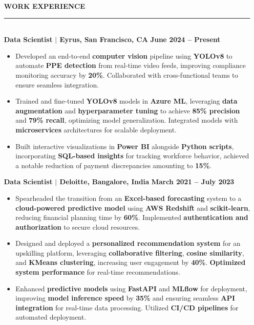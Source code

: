 \documentclass{article}
\begin{document}
\noindent \textbf{{WORK EXPERIENCE}} \vspace{-8pt} \\
\rule{\linewidth}{0.5pt} \\
\noindent \textbf{Data Scientist $\mid$ Eyrus, San Francisco, CA} \hfill \textbf{June 2024 -- Present}
\begin{itemize}[noitemsep, nolistsep, leftmargin=*]
    \item Developed an end-to-end \textbf{computer vision} pipeline using \textbf{YOLOv8} to automate \textbf{PPE detection} from real-time video feeds, improving compliance monitoring accuracy by \textbf{20\%}. Collaborated with cross-functional teams to ensure seamless integration.
    \item Trained and fine-tuned \textbf{YOLOv8} models in \textbf{Azure ML}, leveraging \textbf{data augmentation} and \textbf{hyperparameter tuning} to achieve \textbf{85\% precision} and \textbf{79\% recall}, optimizing model generalization. Integrated models with \textbf{microservices} architectures for scalable deployment.
    \item Built interactive visualizations in \textbf{Power BI} alongside \textbf{Python scripts}, incorporating \textbf{SQL-based insights} for tracking workforce behavior, achieved a notable reduction of payment discrepancies amounting to \textbf{15\%}.
\end{itemize}

\vspace{1mm}
\noindent \textbf{Data Scientist $\mid$ Deloitte, Bangalore, India} \hfill \textbf{March 2021 -- July 2023}
\begin{itemize}[noitemsep, nolistsep, leftmargin=*]
    \item Spearheaded the transition from an \textbf{Excel-based forecasting} system to a \textbf{cloud-powered predictive model} using \textbf{AWS Redshift} and \textbf{scikit-learn}, reducing financial planning time by \textbf{60\%}. Implemented \textbf{authentication and authorization} to secure cloud resources.
    \item Designed and deployed a \textbf{personalized recommendation system} for an upskilling platform, leveraging \textbf{collaborative filtering}, \textbf{cosine similarity}, and \textbf{KMeans clustering}, increasing user engagement by \textbf{40\%}. \textbf{Optimized system performance} for real-time recommendations.
    \item Enhanced \textbf{predictive models} using \textbf{FastAPI} and \textbf{MLflow} for deployment, improving \textbf{model inference speed} by \textbf{35\%} and ensuring seamless \textbf{API integration} for real-time data processing. Utilized \textbf{CI/CD pipelines} for automated deployment.
\end{itemize}
\end{document}
